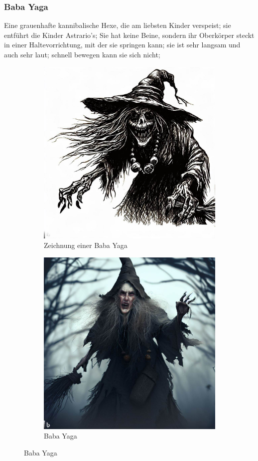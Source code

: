 \documentclass[11pt, twoside]{article}
\begin{document}
\subsubsection{Baba Yaga\label{baba}}
\label{sec:org2c6272f}
Eine grauenhafte kannibalische Hexe, die am liebsten Kinder verspeist; sie entführt die Kinder Astrario’s; Sie hat keine Beine, sondern ihr Oberkörper steckt in einer Haltevorrichtung, mit der sie springen kann; sie ist sehr langsam und auch sehr laut; schnell bewegen kann sie sich nicht;
\begin{figure}[H]
\centering
\caption{Baba Yaga}
\label{fig:baba}
  \begin{subfigure}{0.5\textwidth}
    \centering
    \includegraphics[width=0.8\linewidth]{baba1.jpeg}
    \caption{Zeichnung einer Baba Yaga}
  \end{subfigure}%
  \begin{subfigure}{0.5\textwidth}
    \centering
    \includegraphics[width=0.8\linewidth]{baba2.jpeg}
    \caption{Baba Yaga}
  \end{subfigure}
\end{figure}
\end{document}
